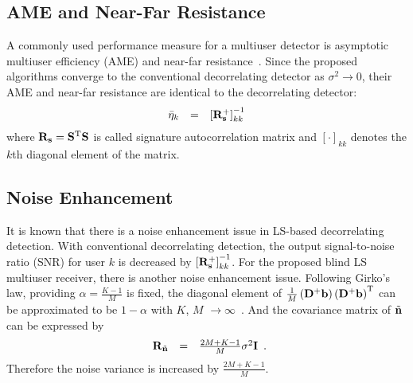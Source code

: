\documentclass[a4paper,10pt,fleqn, twocolumn]{IEEETran}
\newcommand{\bb}{{\bf b}}
\newcommand{\bs}{{\bf s}}
\newcommand{\bn}{{\bf n}}
\newcommand{\bS}{{\bf S}}
\newcommand{\bD}{{\bf D}}
\newcommand{\bI}{{\bf I}}
\newcommand{\bR}{{\bf R}}
\begin{document}
\subsection{AME and Near-Far Resistance} A commonly used
performance measure for a multiuser detector is asymptotic
multiuser efficiency (AME) and near-far resistance~\cite{Verd98}.
Since the proposed algorithms converge to the conventional
decorrelating detector as $\sigma^2\rightarrow 0$, their AME and
near-far resistance are identical to the decorrelating detector:
\begin{equation}
\begin{array}{rcl}
\bar{\eta}_k&=&\left[\bR_{\bs}^{+}\right]_{kk}^{-1}
\end{array}
\end{equation}
\noindent where $\bR_{\bs}=\bS^{\rm T}\bS$ is called signature
autocorrelation matrix and $\left[\cdot\right]_{kk}$ denotes the
$k$th diagonal element of the matrix.

\subsection{Noise Enhancement} It is known that there is a noise
enhancement issue in LS-based decorrelating detection. With
conventional decorrelating detection, the output signal-to-noise
ratio (SNR) for user $k$ is decreased by
$\left[\bR_{\bs}^{+}\right]_{kk}^{-1}$. For the proposed blind LS
multiuser receiver, there is another noise enhancement issue.
Following Girko's law, providing $\alpha=\frac{K-1}{M}$ is fixed,
the diagonal element of
$\frac{1}{M}\left(\bD^{+}\bb\right)\left(\bD^{+}\bb\right)^{\rm
T}$ can be approximated to be $1-\alpha$ with $K$, $M$
$\rightarrow\infty$~\cite{Muller}. And the covariance matrix of
$\tilde\bn$ can be expressed by
\begin{equation}
\begin{array}{rcl}
\bR_{\tilde\bn}&=&\frac{2M+K-1}{M}\sigma^{2}\bI
\end{array}.\label{noise_var_new}
\end{equation}
\noindent Therefore the noise variance is increased by
$\frac{2M+K-1}{M}$.
\end{document}
